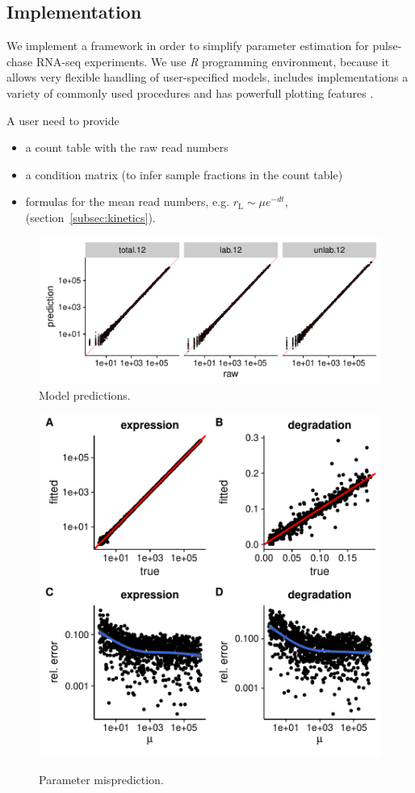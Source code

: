\subsection{Implementation}
We implement a framework in order  to simplify parameter estimation for 
pulse-chase RNA-seq experiments. 
We use \emph{R} programming environment, 
because it allows very flexible handling of user-specified models, 
includes implementations a variety of commonly used procedures and 
has powerfull plotting features \citep{rlang}.
\par A user need to provide
\begin{itemize}
 \item a count table with the raw read numbers
 \item a condition matrix (to infer sample fractions in the count table)
 \item formulas for the mean read numbers, e.g. 
 $r_\text{L}\sim \mu e^{-dt}$, (section~\ref{subsec:kinetics}).
\end{itemize}


\begin{figure}
 \includegraphics[width=\linewidth]{fig/predictions}
 \caption{Model predictions.}
\end{figure}

\begin{figure}
 \includegraphics[width=\linewidth]{fig/parameters}\\
 \caption{Parameter misprediction.}
\end{figure}